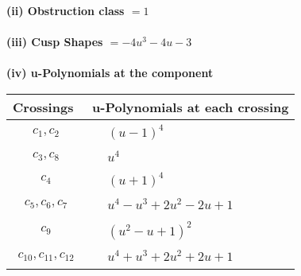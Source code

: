\documentclass[1p]{elsarticle_modified}
\theoremstyle{definition}
\begin{document}
\flushleft \textbf{(ii) Obstruction class $= 1$}\\~\\
\flushleft \textbf{(iii) Cusp Shapes $= -4 u^3-4 u-3$}\\~\\
\newpage\renewcommand{\arraystretch}{1}
\flushleft \textbf{(iv) u-Polynomials at the component}\newline \\
\begin{tabular}{m{50pt}|m{274pt}}
Crossings & \hspace{64pt}u-Polynomials at each crossing \\
\hline $$\begin{aligned}c_{1},c_{2}\end{aligned}$$&$\begin{aligned}
&(u-1)^4
\end{aligned}$\\
\hline $$\begin{aligned}c_{3},c_{8}\end{aligned}$$&$\begin{aligned}
&u^4
\end{aligned}$\\
\hline $$\begin{aligned}c_{4}\end{aligned}$$&$\begin{aligned}
&(u+1)^4
\end{aligned}$\\
\hline $$\begin{aligned}c_{5},c_{6},c_{7}\end{aligned}$$&$\begin{aligned}
&u^4- u^3+2 u^2-2 u+1
\end{aligned}$\\
\hline $$\begin{aligned}c_{9}\end{aligned}$$&$\begin{aligned}
&(u^2- u+1)^2
\end{aligned}$\\
\hline $$\begin{aligned}c_{10},c_{11},c_{12}\end{aligned}$$&$\begin{aligned}
&u^4+u^3+2 u^2+2 u+1
\end{aligned}$\\
\hline
\end{tabular}\\~\\
\end{document}
